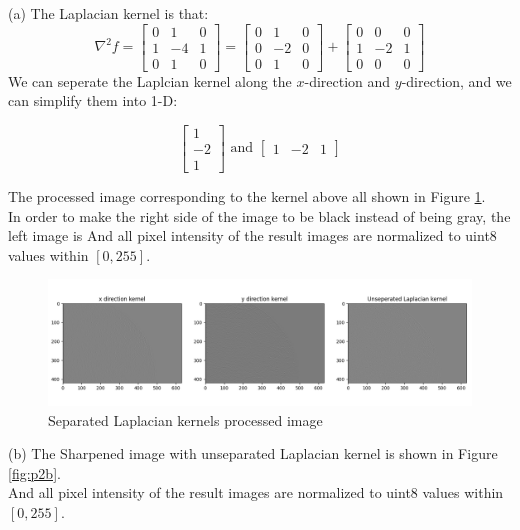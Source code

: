 \problem{}
(a) The Laplacian kernel is that:
$$
\nabla^2 f = \begin{bmatrix}
    0 & 1 & 0 \\
    1 & -4 & 1 \\
    0 & 1 & 0
\end{bmatrix}
=
\begin{bmatrix}
    0 & 1 & 0 \\
    0 & -2 & 0 \\
    0 & 1 & 0
\end{bmatrix}
+
\begin{bmatrix}
    0 & 0 & 0 \\
    1 & -2 & 1 \\
    0 & 0 & 0
\end{bmatrix}
$$
We can seperate the Laplcian kernel along the $x$-direction and $y$-direction, and we can simplify them into 1-D:

$$\begin{bmatrix}1\\-2\\1\end{bmatrix} \text{\ \ and \ \ } \begin{bmatrix}1 & -2 & 1\end{bmatrix}$$

The processed image corresponding to the kernel above all shown in Figure \ref{fig:p2a}.\\
In order to make the right side of the image to be black instead of being gray, the left image is
And all pixel intensity of the result images are normalized to uint8 values within $[0,255]$.\\

\begin{figure}[htbp]
    \centering
	\includegraphics[width=1\textwidth]{../images/p2/p2a.png}
    \caption{Separated Laplacian kernels processed image}
\label{fig:p2a}
\end{figure}


(b) The Sharpened image with unseparated Laplacian kernel is shown in Figure \ref{fig:p2b}.\\
And all pixel intensity of the result images are normalized to uint8 values within $[0,255]$.\\

